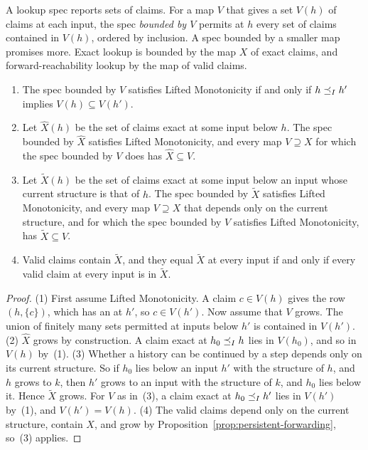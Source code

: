 A lookup spec reports sets of claims.  For a map $V$ that gives a set $V(h)$
of claims at each input, the spec \emph{bounded by $V$} permits at $h$ every
set of claims contained in $V(h)$, ordered by inclusion.  A spec bounded by a
smaller map promises more.  Exact lookup is bounded by the map $X$ of exact
claims, and forward-reachability lookup by the map of valid claims.

\begin{proposition}
\label{prop:remembered-claims}
\leavevmode
\begin{enumerate}
  \item The spec bounded by $V$ satisfies Lifted Monotonicity if and only if
        $h\preceq_I h'$ implies $V(h)\subseteq V(h')$.
  \item Let $\widehat X(h)$ be the set of claims exact at some input below
        $h$.  The spec bounded by $\widehat X$ satisfies Lifted Monotonicity,
        and every map $V\supseteq X$ for which the spec bounded by $V$ does
        has $\widehat X\subseteq V$.
  \item Let $\widetilde X(h)$ be the set of claims exact at some input below an
        input whose current structure is that of $h$.  The spec bounded by
        $\widetilde X$ satisfies Lifted Monotonicity, and every map
        $V\supseteq X$ that depends only on the current structure, and for
        which the spec bounded by $V$ satisfies Lifted Monotonicity, has
        $\widetilde X\subseteq V$.
  \item Valid claims contain $\widetilde X$, and they equal $\widetilde X$ at
        every input if and only if every valid claim at every input is in
        $\widetilde X$.
\end{enumerate}
\end{proposition}

\begin{proof}
(1) First assume Lifted Monotonicity.  A claim $c\in V(h)$ gives the row
$(h,\{c\})$, which has an \outnoun at $h'$, so $c\in V(h')$.  Now assume that
$V$ grows.  The union of finitely many sets permitted at inputs below $h'$ is
contained in $V(h')$.  (2) $\widehat X$ grows by construction.  A claim exact
at $h_0\preceq_I h$ lies in $V(h_0)$, and so in $V(h)$ by~(1).  (3) Whether a
history can be continued by a step depends only on its current structure.  So
if $h_0$ lies below an input $h'$ with the structure of $h$, and $h$ grows to
$k$, then $h'$ grows to an input with the structure of $k$, and $h_0$ lies
below it.  Hence $\widetilde X$ grows.  For $V$ as in~(3), a claim exact at
$h_0\preceq_I h'$ lies in $V(h')$ by~(1), and $V(h')=V(h)$.  (4) The valid
claims depend only on the current structure, contain $X$, and grow by
Proposition~\ref{prop:persistent-forwarding}, so~(3) applies.
\end{proof}

